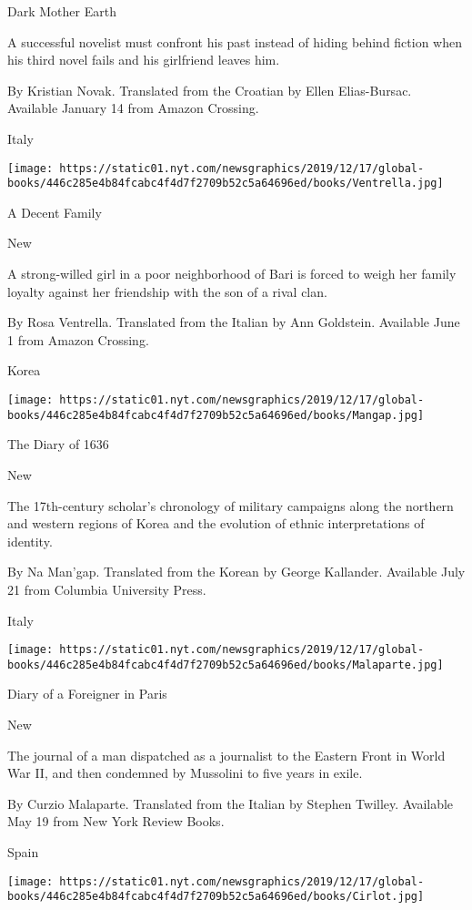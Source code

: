 Dark Mother Earth

A successful novelist must confront his past instead of hiding behind
fiction when his third novel fails and his girlfriend leaves him.

 By Kristian Novak. Translated from the Croatian by Ellen Elias-Bursac.
Available January 14 from Amazon Crossing.

Italy

\texttt{[image: https://static01.nyt.com/newsgraphics/2019/12/17/global-books/446c285e4b84fcabc4f4d7f2709b52c5a64696ed/books/Ventrella.jpg]}

A Decent Family

New

A strong-willed girl in a poor neighborhood of Bari is forced to weigh
her family loyalty against her friendship with the son of a rival clan.

 By Rosa Ventrella. Translated from the Italian by Ann Goldstein.
Available June 1 from Amazon Crossing.

Korea

\texttt{[image: https://static01.nyt.com/newsgraphics/2019/12/17/global-books/446c285e4b84fcabc4f4d7f2709b52c5a64696ed/books/Mangap.jpg]}

The Diary of 1636

New

The 17th-century scholar's chronology of military campaigns along the
northern and western regions of Korea and the evolution of ethnic
interpretations of identity.

 By Na Man'gap. Translated from the Korean by George Kallander.
Available July 21 from Columbia University Press.

Italy

\texttt{[image: https://static01.nyt.com/newsgraphics/2019/12/17/global-books/446c285e4b84fcabc4f4d7f2709b52c5a64696ed/books/Malaparte.jpg]}

Diary of a Foreigner in Paris

New

The journal of a man dispatched as a journalist to the Eastern Front in
World War II, and then condemned by Mussolini to five years in exile.

 By Curzio Malaparte. Translated from the Italian by Stephen Twilley.
Available May 19 from New York Review Books.

Spain

\texttt{[image: https://static01.nyt.com/newsgraphics/2019/12/17/global-books/446c285e4b84fcabc4f4d7f2709b52c5a64696ed/books/Cirlot.jpg]}

